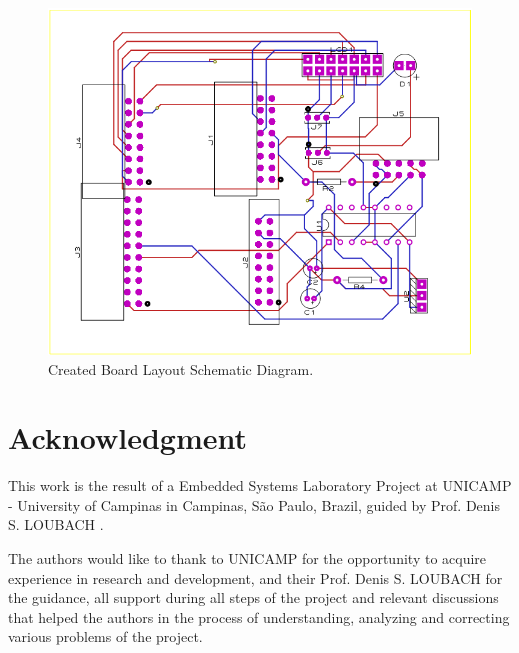 \documentclass[journal]{IEEEtran}
\begin{document}
\begin{figure}[!ht]%
  \includegraphics[scale=0.49]{boardLayout.png}
  \centering
  \caption{Created Board Layout Schematic Diagram.}
\end{figure}


\section*{Acknowledgment}

This work is the result of a Embedded Systems Laboratory Project at UNICAMP - University of Campinas in Campinas, S\~{a}o Paulo, Brazil, guided by Prof. Denis S. LOUBACH \cite{IEEEhowto:denis}.

The authors would like to thank to UNICAMP for the opportunity to acquire experience in research and development, and their Prof. Denis S. LOUBACH for the guidance,  all support during all steps of the project and relevant discussions that helped the authors in the process of understanding, analyzing and correcting various problems of the project.


\ifCLASSOPTIONcaptionsoff
  \newpage
\fi
\end{document}
